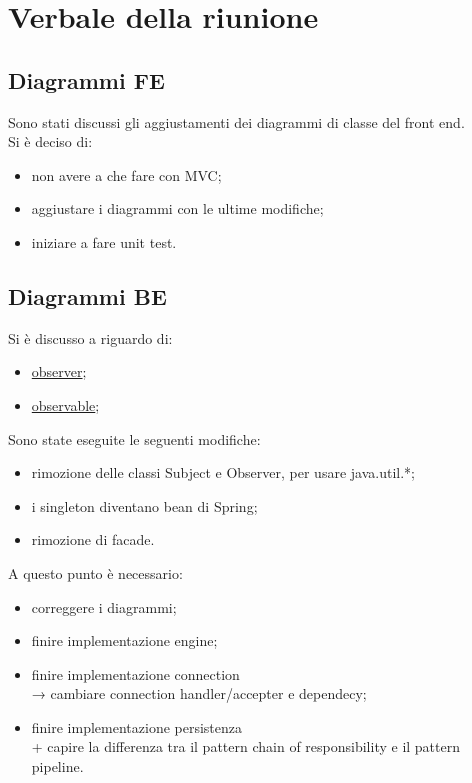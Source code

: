 \section{Verbale della riunione}

\subsection{Diagrammi FE}
Sono stati discussi gli aggiustamenti dei diagrammi di classe del front end.
\\Si è deciso di:
\begin{itemize}
	\item non avere a che fare con MVC;
	\item aggiustare i diagrammi con le ultime modifiche;
	\item iniziare a fare unit test.
\end{itemize}


\subsection{Diagrammi BE}
Si è discusso a riguardo di:
\begin{itemize}
	\item \href{https://docs.oracle.com/javase/8/docs/api/java/util/Observer.html}{observer};
	\item \href{https://docs.oracle.com/javase/8/docs/api/java/util/Observable.html}{observable};
\end{itemize}
Sono state eseguite le seguenti modifiche:
\begin{itemize}
	\item rimozione delle classi Subject e Observer, per usare java.util.*;
	\item i singleton diventano bean di Spring;
	\item rimozione di facade.
\end{itemize}
A questo punto è necessario:
\begin{itemize}
	\item correggere i diagrammi;
	\item finire implementazione engine;
	\item finire implementazione connection \\→ cambiare connection handler/accepter e dependecy;
	\item finire implementazione persistenza\\+ capire la differenza tra il pattern chain of responsibility e il pattern pipeline.
\end{itemize}

